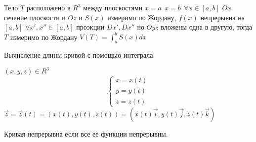 \begin{theorem}
  Тело $T$ расположено в $R^3$ между плоскостями $x = a ~~ x = b ~~
  \forall x \in [a,b]$ $Ox$ сечение плоскости и $Oz$ и $S(x)$ измеримо по
  Жордану, $f(x)$ непрерывна на $[a,b]$ $\forall x', x'' \in [a,b]$ проэкции
  $Dx', Dx''$ но $Oyz$ вложены одна в другую, тогда $T$ измеримо по Жордану
  $V(T) = \int_a^b S(x) dx$
\end{theorem}

\begin{title}[\Large]
  Вычисление длины кривой с помощью интеграла.
\end{title}

\begin{defin}[кривой]
  $(x,y,z) \in R^3$
  $$
    \left\{
      \begin{array}{l}
        x = x(t) \\
        y = y(t) \\
        z = z(t)
      \end{array}
    \right.
  $$
  $
  \vec z = \vec z (t) = ( x(t), y(t) , z(t) ) =
  ( x(t)\vec i, y(t)\vec j , z(t)\vec k )
  $
\end{defin}

Кривая непрерывна если все ее функции непрерывны.